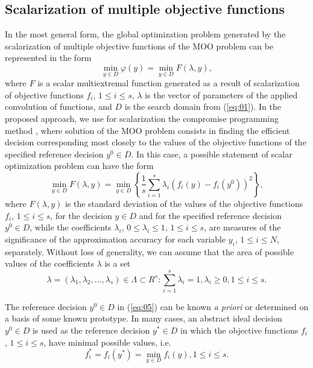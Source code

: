 \documentclass[runningheads]{llncs}
\begin{document}
\subsection{Scalarization of multiple objective functions} 
In the most general form, the global optimization problem generated by the scalarization of multiple objective functions of the MOO problem can be represented in the form
\begin{equation}
\label{eq:04}
\min_{y \in D} {\varphi(y)} = \min_{y \in D} F(\lambda, y),
\end{equation}
where $F$ is a scalar multiextremal function generated as a result of scalarization of objective functions $f_i$, $1 \leq i \leq s$, $\lambda$ is the vector of parameters of the applied convolution of functions, and $D$ is the search domain from (\ref{eq:01}). In the proposed approach, we use for scalarization the compromise programming method \cite{c2,c11}, where solution of the MOO problem consists in finding the efficient decision corresponding most closely to the values of the objective functions of the specified reference decision $y^0 \in D$. In this case, a possible statement of scalar optimization problem can have the form 
\begin{equation}
\label{eq:05}
\min_{y \in D} F(\lambda,y)=\min_{y \in D} \left\{ \frac{1}{s} \sum_{i=1}^s {\lambda_i (f_i (y)-f_i (y^0 ))^2} \right\},
\end{equation}
where $F(\lambda,y)$ is the standard deviation of the values of the objective functions $f_i$, $1 \leq i \leq s$, for the decision $y \in D$ and for the specified reference decision $y^0 \in D$, while the coefficients $\lambda_i$, $0 \leq \lambda_i \leq 1$, $1 \leq i \leq s$, are measures of the significance of the approximation accuracy for each variable $y_i$, $1 \leq i \leq N$, separately. Without loss of generality, we can assume that the area of possible values of the coefficients $\lambda$ is a set 
\begin{equation}
\label{eq:06}
\lambda=(\lambda_1,\lambda_2, \dots, \lambda_s)\in \Lambda \subset R^s: \sum_{i=1}^{s}\lambda_i=1, \lambda_i \geq 0, 1 \leq i \leq s.
\end{equation}

The reference decision $y^0 \in D$ in (\ref{eq:05}) can be known \textit{a priori} or determined on a basis of some known prototype. In many cases, an abstract ideal decision $y^0 \in D$ is used as the reference decision $y^*\in D$ in which the objective functions $f_i$, $1 \leq i \leq s$, have minimal possible values, i.e.
\begin{equation}
\label{eq:07}
f_i^* =f_i (y^*)=\min_{y \in D} f_i (y), 1 \leq i \leq s.
\end{equation}
\end{document}
